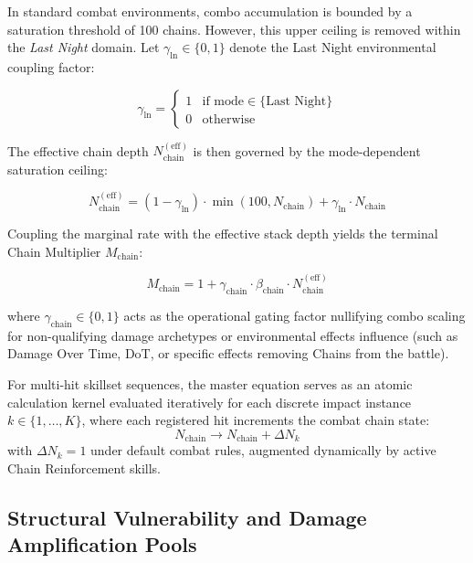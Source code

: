\documentclass[twocolumn,10pt]{article}
\begin{document}
In standard combat environments, combo accumulation is bounded by a saturation threshold of 100 chains. However, this upper ceiling is removed within the \textit{Last Night} domain. Let $\gamma_{\text{ln}} \in \{0, 1\}$ denote the Last Night environmental coupling factor:

\begin{equation}
\label{eq:gamma_ln}
  \gamma_{\text{ln}} = 
  \begin{cases} 
    1 & \text{if mode} \in \{\text{Last Night}\} \\ 
    0 & \text{otherwise} 
  \end{cases}
\end{equation}

The effective chain depth $N_{\text{chain}}^{(\text{eff})}$ is then governed by the mode-dependent saturation ceiling:

\begin{equation}
\label{eq:eff_chain_count}
  N_{\text{chain}}^{(\text{eff})} = (1 - \gamma_{\text{ln}}) \cdot \min\left(100, N_{\text{chain}}\right) + \gamma_{\text{ln}} \cdot N_{\text{chain}}
\end{equation}

Coupling the marginal rate with the effective stack depth yields the terminal Chain Multiplier $M_{\text{chain}}$:

\begin{equation}
\label{eq:chain_multiplier}
  M_{\text{chain}} = 1 + \gamma_{\text{chain}} \cdot \beta_{\text{chain}} \cdot N_{\text{chain}}^{(\text{eff})}
\end{equation}

where $\gamma_{\text{chain}} \in \{0, 1\}$ acts as the operational gating factor nullifying combo scaling for non-qualifying damage archetypes or environmental effects influence (such as Damage Over Time, DoT, or specific effects removing Chains from the battle).

For multi-hit skillset sequences, the master equation serves as an atomic calculation kernel evaluated iteratively for each discrete impact instance $k \in \{1, \dots, K\}$, where each registered hit increments the combat chain state:
\begin{equation}
N_{\text{chain}} \longrightarrow N_{\text{chain}} + \Delta N_k
\end{equation}
with $\Delta N_k = 1$ under default combat rules, augmented dynamically by active Chain Reinforcement skills.

\subsection{Structural Vulnerability and Damage Amplification Pools}
\end{document}
